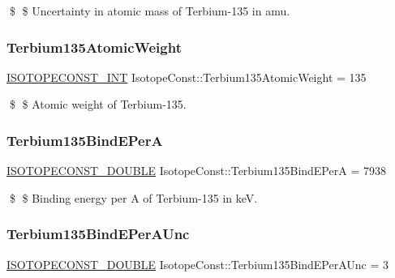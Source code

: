 \$ \$ Uncertainty in atomic mass of Terbium-\/135 in amu. \mbox{\label{group___isotope_const-_terbium-_tb135_ga1057a3c04b65a5a90a6bb048f73f3cfb}} 
\subsubsection{\texorpdfstring{Terbium135\+Atomic\+Weight}{Terbium135AtomicWeight}}
{\footnotesize\ttfamily \mbox{\hyperlink{group___isotope_const-_macros_ga5f18360b3e99483a35c32d789e62621c}{I\+S\+O\+T\+O\+P\+E\+C\+O\+N\+S\+T\+\_\+\+I\+NT}} Isotope\+Const\+::\+Terbium135\+Atomic\+Weight = 135}

\$ \$ Atomic weight of Terbium-\/135. \mbox{\label{group___isotope_const-_terbium-_tb135_ga5c4dea00447b27c82d509cea8e132dba}} 
\subsubsection{\texorpdfstring{Terbium135\+Bind\+E\+PerA}{Terbium135BindEPerA}}
{\footnotesize\ttfamily \mbox{\hyperlink{group___isotope_const-_macros_ga8f45a7272ce02c0b4c65c44636ed719a}{I\+S\+O\+T\+O\+P\+E\+C\+O\+N\+S\+T\+\_\+\+D\+O\+U\+B\+LE}} Isotope\+Const\+::\+Terbium135\+Bind\+E\+PerA = 7938}

\$ \$ Binding energy per A of Terbium-\/135 in keV. \mbox{\label{group___isotope_const-_terbium-_tb135_ga0ca7f5a700f2ebf6db8ac7004949b85f}} 
\subsubsection{\texorpdfstring{Terbium135\+Bind\+E\+Per\+A\+Unc}{Terbium135BindEPerAUnc}}
{\footnotesize\ttfamily \mbox{\hyperlink{group___isotope_const-_macros_ga8f45a7272ce02c0b4c65c44636ed719a}{I\+S\+O\+T\+O\+P\+E\+C\+O\+N\+S\+T\+\_\+\+D\+O\+U\+B\+LE}} Isotope\+Const\+::\+Terbium135\+Bind\+E\+Per\+A\+Unc = 3}

